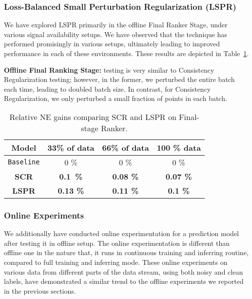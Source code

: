 \subsubsection{Loss-Balanced Small Perturbation Regularization (LSPR)}
We have explored LSPR primarily in the offline Final Ranker Stage, under various signal availability setups. We have observed that the technique has performed promisingly in various setups, ultimately leading to improved performance in each of these environments. These results are depicted in Table~\ref{tab:rel_ne2}.



\noindent\textbf{Offline Final Ranking Stage:} testing is very similar to Consistency Regularization testing; however, in the former, we perturbed the entire batch each time, leading to doubled batch size. 
In contrast, for Consistency Regularization, we only perturbed a small fraction of points in each batch.\\

\begin{table}
  \caption{Relative NE gains comparing SCR and LSPR on Final-stage Ranker.} 
  \label{tab:rel_ne2}
  \centering
  \begin{tabular}{cccc}
    \toprule
    Model & 33\% of data &  66\% of data & 100 \% data\\
    \midrule
   \texttt{Baseline} & 0 \% & 0 \% &  0 \% \\
    \textbf{SCR} & \bf{0.1\ \% } & \bf{0.08 \%} &  \bf{0.07 \%}\\
    \textbf{LSPR} & \bf{0.13 \% } & \bf{0.11 \%} &  \bf{0.1 \%}\\
    \bottomrule
  \end{tabular}
\end{table}


\subsubsection{Online Experiments}

We additionally have conducted online experimentation for a prediction model after testing it in offline setup.
The online experimentation is different than offline one in the nature that, it runs in continuous training and inferring routine, compared to full training and inferring mode.
% 
These online experiments on various data from different parts of the data stream, using both noisy and clean labels, have demonstrated a similar trend to the offline experiments we reported in the previous sections.

